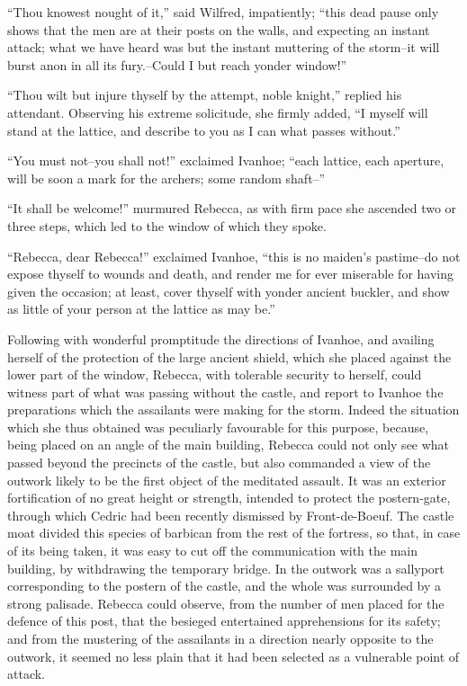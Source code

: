 ``Thou knowest nought of it,'' said Wilfred, impatiently; ``this dead
pause only shows that the men are at their posts on the walls, and
expecting an instant attack; what we have heard was but the instant
muttering of the storm--it will burst anon in all its fury.--Could I but
reach yonder window!''

``Thou wilt but injure thyself by the attempt, noble knight,'' replied
his attendant. Observing his extreme solicitude, she firmly added, ``I
myself will stand at the lattice, and describe to you as I can what
passes without.''

``You must not--you shall not!'' exclaimed Ivanhoe; ``each lattice, each
aperture, will be soon a mark for the archers; some random shaft--''

``It shall be welcome!'' murmured Rebecca, as with firm pace she
ascended two or three steps, which led to the window of which they
spoke.

``Rebecca, dear Rebecca!'' exclaimed Ivanhoe, ``this is no maiden's
pastime--do not expose thyself to wounds and death, and render me for
ever miserable for having given the occasion; at least, cover thyself
with yonder ancient buckler, and show as little of your person at the
lattice as may be.''

Following with wonderful promptitude the directions of Ivanhoe, and
availing herself of the protection of the large ancient shield, which
she placed against the lower part of the window, Rebecca, with tolerable
security to herself, could witness part of what was passing without the
castle, and report to Ivanhoe the preparations which the assailants were
making for the storm. Indeed the situation which she thus obtained was
peculiarly favourable for this purpose, because, being placed on an
angle of the main building, Rebecca could not only see what passed
beyond the precincts of the castle, but also commanded a view of the
outwork likely to be the first object of the meditated assault. It was
an exterior fortification of no great height or strength, intended to
protect the postern-gate, through which Cedric had been recently
dismissed by Front-de-Boeuf. The castle moat divided this species of
barbican from the rest of the fortress, so that, in case of its being
taken, it was easy to cut off the communication with the main building,
by withdrawing the temporary bridge. In the outwork was a sallyport
corresponding to the postern of the castle, and the whole was surrounded
by a strong palisade. Rebecca could observe, from the number of men
placed for the defence of this post, that the besieged entertained
apprehensions for its safety; and from the mustering of the assailants
in a direction nearly opposite to the outwork, it seemed no less plain
that it had been selected as a vulnerable point of attack.


